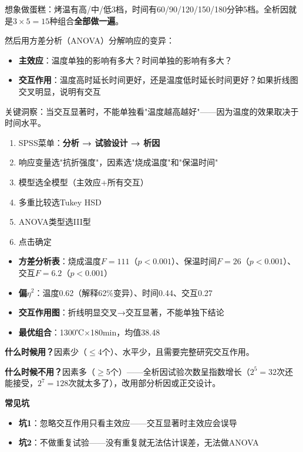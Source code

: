 \begin{algoprinciple}
想象做蛋糕：烤温有高/中/低3档，时间有60/90/120/150/180分钟5档。全析因就是$3\times5=15$种组合\textbf{全部做一遍}。

然后用方差分析（ANOVA）分解响应的变异：
\begin{itemize}
    \item \textbf{主效应}：温度单独的影响有多大？时间单独的影响有多大？
    \item \textbf{交互作用}：温度高时延长时间更好，还是温度低时延长时间更好？如果折线图交叉明显，说明有交互
\end{itemize}

关键洞察：当交互显著时，不能单独看"温度越高越好"——因为温度的效果取决于时间水平。
\end{algoprinciple}

\begin{algosposs}
\begin{enumerate}
    \item SPSS菜单：\textbf{分析 → 试验设计 → 析因}
    \item 响应变量选"抗折强度"，因素选"烧成温度"和"保温时间"
    \item 模型选全模型（主效应+所有交互）
    \item 多重比较选Tukey HSD
    \item ANOVA类型选III型
    \item 点击确定
\end{enumerate}
\end{algosposs}

\begin{algoresult}
\begin{itemize}
    \item \textbf{方差分析表}：烧成温度$F=111$（$p<0.001$）、保温时间$F=26$（$p<0.001$）、交互$F=6.2$（$p<0.001$）
    \item \textbf{偏$\eta^2$}：温度0.62（解释62\%变异）、时间0.44、交互0.27
    \item \textbf{交互作用图}：折线明显交叉→交互显著，不能单独下结论
    \item \textbf{最优组合}：1300℃$\times$180min，均值38.48
\end{itemize}
\end{algoresult}

\begin{algonotes}
\textbf{什么时候用？}因素少（$\leq$4个）、水平少，且需要完整研究交互作用。

\textbf{什么时候不用？}因素多（$\geq$5个）——全析因试验次数呈指数增长（$2^5=32$次还能接受，$2^7=128$次就太多了），改用部分析因或正交设计。

\textbf{常见坑}
\begin{itemize}
    \item \textbf{坑1}：忽略交互作用只看主效应——交互显著时主效应会误导
    \item \textbf{坑2}：不做重复试验——没有重复就无法估计误差，无法做ANOVA
\end{itemize}
\end{algonotes}

